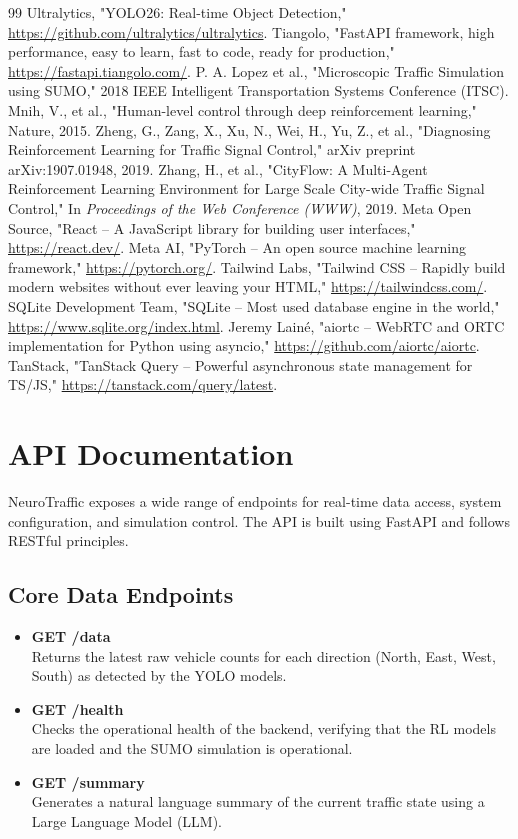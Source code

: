\documentclass[12pt,a4paper]{report}
\begin{document}
\begin{thebibliography}{99}
 Ultralytics, "YOLO26: Real-time Object Detection," \url{https://github.com/ultralytics/ultralytics}.
 Tiangolo, "FastAPI framework, high performance, easy to learn, fast to code, ready for production," \url{https://fastapi.tiangolo.com/}.
 P. A. Lopez et al., "Microscopic Traffic Simulation using SUMO," 2018 IEEE Intelligent Transportation Systems Conference (ITSC).
 Mnih, V., et al., "Human-level control through deep reinforcement learning," Nature, 2015.
 Zheng, G., Zang, X., Xu, N., Wei, H., Yu, Z., et al., "Diagnosing Reinforcement Learning for Traffic Signal Control," arXiv preprint arXiv:1907.01948, 2019.
 Zhang, H., et al., "CityFlow: A Multi-Agent Reinforcement Learning Environment for Large Scale City-wide Traffic Signal Control," In \textit{Proceedings of the Web Conference (WWW)}, 2019.
 Meta Open Source, "React -- A JavaScript library for building user interfaces," \url{https://react.dev/}.
 Meta AI, "PyTorch -- An open source machine learning framework," \url{https://pytorch.org/}.
 Tailwind Labs, "Tailwind CSS -- Rapidly build modern websites without ever leaving your HTML," \url{https://tailwindcss.com/}.
 SQLite Development Team, "SQLite -- Most used database engine in the world," \url{https://www.sqlite.org/index.html}.
 Jeremy Lainé, "aiortc -- WebRTC and ORTC implementation for Python using asyncio," \url{https://github.com/aiortc/aiortc}.
 TanStack, "TanStack Query -- Powerful asynchronous state management for TS/JS," \url{https://tanstack.com/query/latest}.
\end{thebibliography}

\appendix
\chapter{API Documentation}
NeuroTraffic exposes a wide range of endpoints for real-time data access, system configuration, and simulation control. The API is built using FastAPI and follows RESTful principles.

\section{Core Data Endpoints}
\begin{itemize}
    \item \textbf{GET /data} \\
    Returns the latest raw vehicle counts for each direction (North, East, West, South) as detected by the YOLO models.
    \item \textbf{GET /health} \\
    Checks the operational health of the backend, verifying that the RL models are loaded and the SUMO simulation is operational.
    \item \textbf{GET /summary} \\
    Generates a natural language summary of the current traffic state using a Large Language Model (LLM).
\end{itemize}
\end{document}
